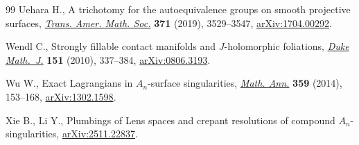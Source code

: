 \documentclass[10pt,a4paper]{amsart}
\theoremstyle{definition}
\numberwithin{equation}{section}
\begin{document}
\begin{thebibliography}{99}
Uehara H., A trichotomy for the autoequivalence groups on smooth projective
 surfaces, \href{https://doi.org/10.1090/tran/7439}{\textit{Trans. Amer. Math.
 Soc.}} \textbf{371} (2019), 3529--3547, \href{http://arxiv.org/abs/1704.00292}{arXiv:1704.00292}.

Wendl C., Strongly fillable contact manifolds and {$J$}-holomorphic foliations,
 \href{https://doi.org/10.1215/00127094-2010-001}{\textit{Duke Math.~J.}}
 \textbf{151} (2010), 337--384, \href{http://arxiv.org/abs/0806.3193}{arXiv:0806.3193}.

Wu W., Exact {L}agrangians in {$A_n$}-surface singularities,
 \href{https://doi.org/10.1007/s00208-013-0993-3}{\textit{Math. Ann.}}
 \textbf{359} (2014), 153--168,
 \href{http://arxiv.org/abs/1302.1598}{arXiv:1302.1598}.

Xie B., Li Y., Plumbings of {L}ens spaces and crepant resolutions of compound
 {${A}_n$}-singularities,
 \href{http://arxiv.org/abs/2511.22837}{arXiv:2511.22837}.

\end{thebibliography}
\end{document}
